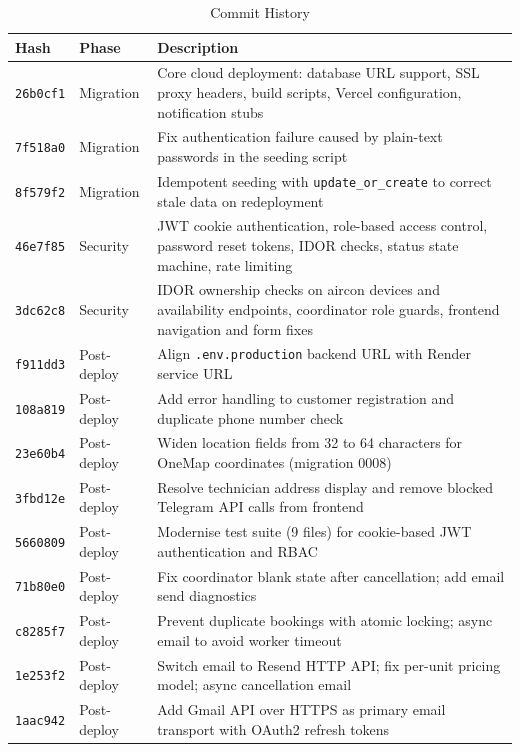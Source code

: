 \documentclass[conference]{IEEEtran}
\begin{document}
\begin{table}[t]
\centering
\caption{Commit History}
\label{tab:commits}
\begin{tabular}{@{}p{1.2cm}p{1.8cm}p{11.5cm}@{}}
\toprule
\textbf{Hash} & \textbf{Phase} & \textbf{Description} \\
\midrule
\texttt{26b0cf1} & Migration & Core cloud deployment: database URL support, SSL proxy headers, build scripts, Vercel configuration, notification stubs \\
\texttt{7f518a0} & Migration & Fix authentication failure caused by plain-text passwords in the seeding script \\
\texttt{8f579f2} & Migration & Idempotent seeding with \texttt{update\_or\_create} to correct stale data on redeployment \\
\texttt{46e7f85} & Security & JWT cookie authentication, role-based access control, password reset tokens, IDOR checks, status state machine, rate limiting \\
\texttt{3dc62c8} & Security & IDOR ownership checks on aircon devices and availability endpoints, coordinator role guards, frontend navigation and form fixes \\
\texttt{f911dd3} & Post-deploy & Align \texttt{.env.production} backend URL with Render service URL \\
\texttt{108a819} & Post-deploy & Add error handling to customer registration and duplicate phone number check \\
\texttt{23e60b4} & Post-deploy & Widen location fields from 32 to 64 characters for OneMap coordinates (migration 0008) \\
\texttt{3fbd12e} & Post-deploy & Resolve technician address display and remove blocked Telegram API calls from frontend \\
\texttt{5660809} & Post-deploy & Modernise test suite (9 files) for cookie-based JWT authentication and RBAC \\
\texttt{71b80e0} & Post-deploy & Fix coordinator blank state after cancellation; add email send diagnostics \\
\texttt{c8285f7} & Post-deploy & Prevent duplicate bookings with atomic locking; async email to avoid worker timeout \\
\texttt{1e253f2} & Post-deploy & Switch email to Resend HTTP API; fix per-unit pricing model; async cancellation email \\
\texttt{1aac942} & Post-deploy & Add Gmail API over HTTPS as primary email transport with OAuth2 refresh tokens \\

\end{tabular}
\end{table}
\end{document}

